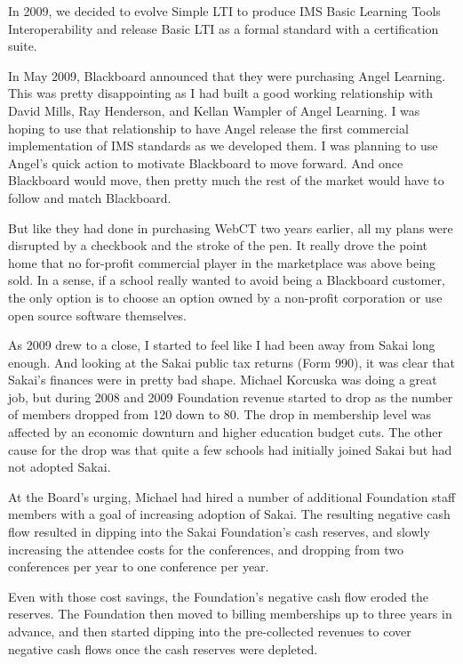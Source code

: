 \documentclass[12pt]{book}
\begin{document}
In 2009, we decided to evolve Simple LTI to produce IMS Basic Learning Tools
Interoperability and release Basic LTI as a formal standard with a certification
suite.


In May 2009, Blackboard announced that they were purchasing Angel Learning.
This was pretty disappointing as I had built a good working
relationship with David Mills, Ray Henderson, and Kellan Wampler of Angel
Learning.   I was hoping to use that relationship to have Angel release the
first commercial implementation of IMS standards as we developed them.
I was planning to use Angel's quick action to motivate Blackboard to
move forward.  And once Blackboard would move, then pretty much the rest of
the market would have to follow and match Blackboard.

But like they had done in purchasing WebCT two years earlier, all my plans
were disrupted by a checkbook and the stroke of the pen.  It really
drove the point home that no for-profit commercial player in the marketplace
was above being sold.   In a sense, if a school really wanted to avoid being
a Blackboard customer, the only option is to choose an option owned by a
non-profit corporation or use open source software themselves.

As 2009 drew to a close, I started to feel like I had been away from Sakai
long enough.   And looking at the Sakai public tax returns (Form 990),
it was clear that Sakai's finances were in pretty bad shape.  Michael Korcuska
was doing a great job, but during 2008 and 2009 Foundation revenue started
to drop as the number of members dropped from 120 down to 80.
The drop in membership level was affected by an economic downturn and
higher education budget cuts.  The other cause for the drop was that quite a few
schools had initially joined Sakai but had not adopted Sakai.

At the Board's urging, Michael had hired a number of additional Foundation
staff members with a goal of increasing adoption of Sakai.
The resulting negative cash flow resulted in dipping
into the Sakai Foundation's cash reserves, and slowly increasing the
attendee costs for the conferences, and dropping from two conferences per
year to one conference per year.

Even with those cost savings, the Foundation's negative cash flow
eroded the reserves.  The Foundation then moved to billing
memberships up to three years in advance, and then started
dipping into the pre-collected revenues to cover negative cash flows
once the cash reserves were depleted.
\end{document}
